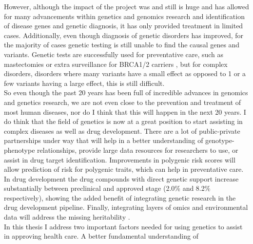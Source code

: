 However, although the impact of the project was and still is huge and has allowed for many advancements within genetics and genomics research\cite{chicheBenchtobedsideReviewFulfilling2002a} and identification of disease genes and genetic diagnosis\cite{claussnitzerBriefHistoryHuman2020b}, it has only provided treatment in limited cases. Additionally, even though diagnosis of genetic disorders has improved, for the majority of cases genetic testing is still unable to find the causal genes and variants\cite{diemenRapidTargetedGenomics2017a}. Genetic tests are successfully used for preventative care, such as mastectomies or extra surveillance for BRCA1/2 carriers \cite{heemskerk-gerritsenSurvivalBilateralRiskreducing2019a}, but for complex disorders, disorders where many variants have a small effect as opposed to 1 or a few variants having a large effect, this is still difficult\cite{claussnitzerBriefHistoryHuman2020b}.  \\

So even though the past 20 years has been full of incredible advances in genomics and genetics research, we are not even close to the prevention and treatment of most human diseases, nor do I think that this will happen in the next 20 years. I do think that the field of genetics is now at a great position to start assisting in complex diseases as well as drug development. There are a lot of public-private partnerships under way that will help in a better understanding of genotype-phenotype relationships\cite{HomepageInternationalCommon}, provide large data resources for researchers to use\cite{finngenFinnGenDocumentationR2,sudlowUKBiobankOpen2015}, or assist in drug target identification\cite{arvalho-silvaOpenTargetsPlatform2019}. Improvements in polygenic risk scores will allow prediction of risk for polygenic traits\cite{kheraGenomewidePolygenicScores2018}, which can help in preventative care. In drug development the drug compounds with direct genetic support increase substantially between preclinical and approved stage (2.0\% and 8.2\% respectively\cite{nelsonSupportHumanGenetic2015b}), showing the added benefit of integrating genetic research in the drug development pipeline. Finally, integrating layers of omics and environmental data will address the missing heritability \cite{claussnitzerBriefHistoryHuman2020b}. \\

In this thesis I address two important factors needed for using genetics to assist in approving health care. A better fundamental understanding of 
	

